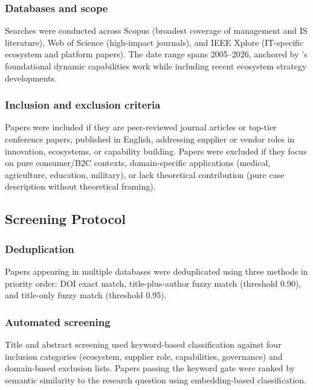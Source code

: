 \subsubsection{Databases and scope}

Searches were conducted across Scopus (broadest coverage of management and IS literature), Web of Science (high-impact journals), and IEEE Xplore (IT-specific ecosystem and platform papers). The date range spans 2005--2026, anchored by \citet{Teece1997}'s foundational dynamic capabilities work while including recent ecosystem strategy developments.

\subsubsection{Inclusion and exclusion criteria}

Papers were included if they are peer-reviewed journal articles or top-tier conference papers, published in English, addressing supplier or vendor roles in innovation, ecosystems, or capability building. Papers were excluded if they focus on pure consumer/B2C contexts, domain-specific applications (medical, agriculture, education, military), or lack theoretical contribution (pure case description without theoretical framing).

\subsection{Screening Protocol}

\subsubsection{Deduplication}

Papers appearing in multiple databases were deduplicated using three methods in priority order: DOI exact match, title-plus-author fuzzy match (threshold 0.90), and title-only fuzzy match (threshold 0.95).

\subsubsection{Automated screening}

Title and abstract screening used keyword-based classification against four inclusion categories (ecosystem, supplier role, capabilities, governance) and domain-based exclusion lists. Papers passing the keyword gate were ranked by semantic similarity to the research question using embedding-based classification.


